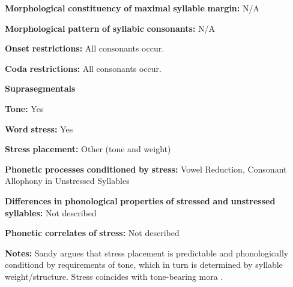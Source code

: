 \begin{styleBody}
\textbf{Morphological} \textbf{constituency} \textbf{of} \textbf{maximal} \textbf{syllable} \textbf{margin:} N/A
\end{styleBody}

\begin{styleBody}
\textbf{Morphological} \textbf{pattern} \textbf{of} \textbf{syllabic} \textbf{consonants:} N/A
\end{styleBody}

\begin{styleBody}
\textbf{Onset} \textbf{restrictions:} All consonants occur.
\end{styleBody}

\begin{styleBody}
\textbf{Coda} \textbf{restrictions:} All consonants occur.
\end{styleBody}

\begin{styleBody}
\textbf{Suprasegmentals}
\end{styleBody}

\begin{styleBody}
\textbf{Tone:} Yes
\end{styleBody}

\begin{styleBody}
\textbf{Word} \textbf{stress:} Yes
\end{styleBody}

\begin{styleBody}
\textbf{Stress} \textbf{placement:} Other (tone and weight)
\end{styleBody}

\begin{styleBody}
\textbf{Phonetic} \textbf{processes} \textbf{conditioned} \textbf{by} \textbf{stress:} Vowel Reduction, Consonant Allophony in Unstressed Syllables
\end{styleBody}

\begin{styleBody}
\textbf{Differences} \textbf{in} \textbf{phonological} \textbf{properties} \textbf{of} \textbf{stressed} \textbf{and} \textbf{unstressed} \textbf{syllables:} Not described
\end{styleBody}

\begin{styleBody}
\textbf{Phonetic} \textbf{correlates} \textbf{of} \textbf{stress:} Not described
\end{styleBody}

\begin{styleBody}
\textbf{Notes:} Sandy argues that stress placement is predictable and phonologically conditiond by requirements of tone, which in turn is determined by syllable weight/structure. Stress coincides with tone-bearing mora \citep[40]{Sandy2014}.
\end{styleBody}

